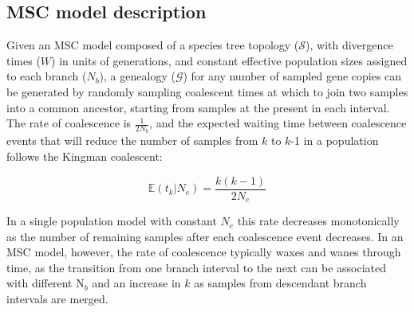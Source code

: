 \documentclass[11pt]{article}
\begin{document}



\subsection{MSC model description}
Given an MSC model composed of a species tree topology ($\mathcal{S}$), with divergence
times ($W$) in units of generations, and constant effective population sizes
assigned to each branch ($N_b$), a genealogy ($\mathcal{G}$) 
for any number of sampled gene copies can be generated by randomly sampling 
coalescent times %
at which to join two samples into a common ancestor, 
starting from samples at the present in each interval. The rate of coalescence
is $\frac{1}{2N_b}$, and the expected waiting time between coalescence events
that will reduce the number of samples from $k$ to $k$-1 in a population 
follows the Kingman coalescent:

\begin{equation}
	\mathbb{E}(t_k| N_e) = \frac{k(k-1)}{2N_e}
\end{equation}

\noindent In a single population model
with constant $N_e$ this rate decreases monotonically as the number of remaining 
samples after each coalescence event decreases. In an MSC model, however, 
the rate of coalescence typically waxes and wanes through time, as the
transition from one branch interval to the next can be associated with 
different N$_b$ and an increase in $k$ as samples from 
descendant branch intervals are merged.
\end{document}
